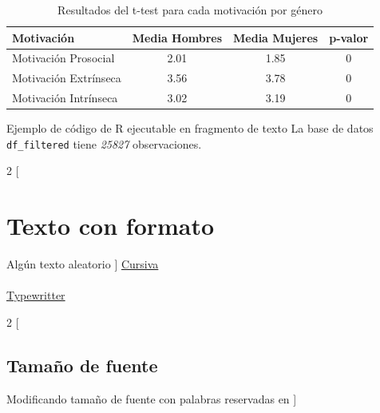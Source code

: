\documentclass{article}
\begin{document}
\begin{table}[h!]
\centering
\caption{Resultados del t-test para cada motivación por género}
\begin{tabular}{lccc}
  \toprule
  \textbf{Motivación} & \textbf{Media Hombres} & \textbf{Media Mujeres} & \textbf{p-valor} \\
  \midrule
  Motivación Prosocial & 2.01 & 1.85 & 0 \\
  Motivación Extrínseca & 3.56 & 3.78 & 0 \\
  Motivación Intrínseca & 3.02 & 3.19 & 0 \\
  \bottomrule
\end{tabular}
\end{table}

































Ejemplo de código de R ejecutable en fragmento de texto
La base de datos \texttt{df_filtered} tiene \emph{25827} observaciones.


\begin{multicols}{2}
[
\section{Texto con formato}
Algún texto aleatorio
]
\noindent \underline{Cursiva}\\  \emph{\blindtext}   \\   \underline{Typewritter}  \\   \texttt{\blindtext}
\end{multicols}


\begin{multicols}{2}
[
\subsection{Tamaño de fuente}
Modificando tamaño de fuente con palabras reservadas en \LaTex
]
{\Huge \blindtext}   {\scriptsize \blindtext}
\end{multicols}
\end{document}

